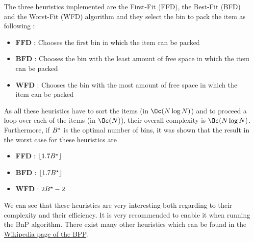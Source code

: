 The three heuristics implemented are the First-Fit (FFD), the Best-Fit (BFD) and the Worst-Fit (WFD) algorithm and they select the bin to pack the item as following :
\begin{itemize}
	\item \textbf{FFD} :  Chooses the first bin in which the item can be packed
	\item \textbf{BFD} :  Chooses the bin with the least amount of free space in which the item can be packed
	\item \textbf{WFD} : Chooses the bin with the most amount of free space in which the item can be packed
\end{itemize}
As all these heuristics have to sort the items (in $\Oc( N\log N)$) and to proceed a loop over each of the items (in $\Oc (N)$), their overall complexity is $\Oc (N\log N)$. Furthermore, if ${B}^{\star}$ is the optimal number of bins, it was shown that the result in the worst case for these heuristics are
\begin{itemize}
	\item \textbf{FFD} :  $\lfloor1.7 {B}^{\star}\rfloor$ \cite{dosa2013first}
	\item \textbf{BFD} : $\lfloor1.7 {B}^{\star}\rfloor$ \cite{dosa2014optimal}
	\item \textbf{WFD} : $2{B}^{\star} - 2$ \cite{johnson1973near}
\end{itemize}
We can see that these heuristics are very interesting both regarding to their complexity and their efficiency. It is very recommended to enable it when running the BnP algorithm. There exist many other heuristics which can be found in the  \href{https://en.wikipedia.org/wiki/Bin_packing_problem#Online_Heuristics}{Wikipedia page of the BPP}.